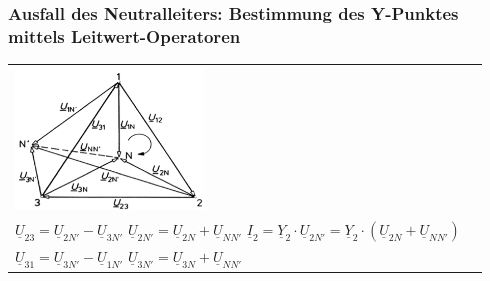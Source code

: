         \subsubsection{Ausfall des Neutralleiters: Bestimmung des Y-Punktes mittels Leitwert-Operatoren}
            \begin{tabular}{p{5cm}p{13cm}}
            	\begin{minipage}{8cm}
                	\includegraphics[width=5cm]{bilder/ZeigerdarstellungVerschobenerSternpunkt.png}
                \end{minipage} &
				\begin{minipage}{13cm}
					\begin{center}
						$ \underline{U}_{12}; \underline{U}_{23}; \underline{U}_{31} \Rightarrow const$
					\end{center}
                	$\underline{U}_{12} = \underline{U}_{1N'} - \underline{U}_{2N'}$ \hspace{0.3cm}
                	$\underline{U}_{1N'} = \underline{U}_{1N} + \underline{U}_{NN'}$ \hspace{0.3cm}
                	$\underline{I}_1 = \underline{Y}_1 \cdot \underline{U}_{1N'} = \underline{Y}_1 \cdot (\underline{U}_{1N} + \underline{U}_{NN'})$ \\
                	$\underline{U}_{23} = \underline{U}_{2N'} - \underline{U}_{3N'}$ \hspace{0.3cm}
                	$\underline{U}_{2N'} = \underline{U}_{2N} + \underline{U}_{NN'}$ \hspace{0.3cm}
                	$\underline{I}_2 = \underline{Y}_2 \cdot \underline{U}_{2N'} = \underline{Y}_2
                	\cdot (\underline{U}_{2N} + \underline{U}_{NN'})$ \\ $\underline{U}_{31} = \underline{U}_{3N'} - \underline{U}_{1N'}$ \hspace{0.3cm}
                	$\underline{U}_{3N'} = \underline{U}_{3N} + \underline{U}_{NN'}$ \hspace{0.3cm}

\end{minipage}
\end{tabular}
